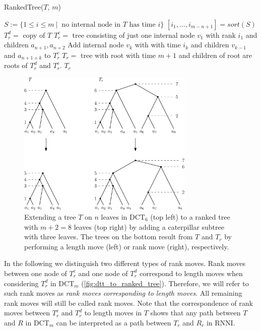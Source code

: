\documentclass[11pt]{amsart}
\newcommand{\rnni}{\mathrm{RNNI}}
\newcommand{\dtt}{\mathrm{DCT}}
\newcommand{\summary}[1]{} %
\begin{document}
\begin{algorithm}[ht]
	\caption{RankedTree($T$, $m$)}
	\label{alg:ranked_tree}
	\begin{algorithmic}[1]
		\STATE $S:= \{1 \leq i \leq m \ |\  \text{ no internal node in } T \text{ has time } i\}$
		\STATE $[i_1, \ldots, i_{m-n+1}] = sort(S)$
		\STATE $T_r^d =$ copy of $T$
		\STATE $T_r^c =$ tree consisting of just one internal node $v_1$ with rank $i_1$ and children $a_{n+1}, a_{n+2}$
			\STATE Add internal node $v_k$ with with time $i_k$ and children $v_{k-1}$ and $a_{n+1+k}$ to $T_r^c$
		\STATE $T_r = $ tree with root with time $m+1$ and children of root are roots of $T_r^d$ and $T_r^c$.
		\ENDFOR
		\RETURN $T_r$
	\end{algorithmic}
\end{algorithm}

\begin{figure}[ht]
	\includegraphics[width=0.75\textwidth]{dtt_to_ranked_tree.eps}
	\caption{Extending a tree $T$ on $n$ leaves in $\dtt_6$ (top left) to a ranked tree with $m+2=8$ leaves (top right) by adding a caterpillar subtree with three leaves.
	The trees on the bottom result from $T$ and $T_r$ by performing a length move (left) or rank move (right), respectively.}
	\label{fig:dtt_to_ranked_tree}
\end{figure}

\summary{Moves on the extended ranked versions of trees -- $\rnni$ vs length moves}
In the following we distinguish two different types of rank moves.
Rank moves between one node of $T_r^c$ and one node of $T_r^d$ correspond to length moves when considering $T_r^d$ in $\dtt_m$ (\autoref{fig:dtt_to_ranked_tree}).
Therefore, we will refer to such rank moves as \emph{rank moves corresponding to length moves}.
All remaining rank moves will still be called rank moves.
Note that the correspondence of rank moves between $T_r^c$ and $T_r^d$ to length moves in $T$ shows that any path between $T$ and $R$ in $\dtt_m$ can be interpreted as a path between $T_r$ and $R_r$ in $\rnni$.
\end{document}
